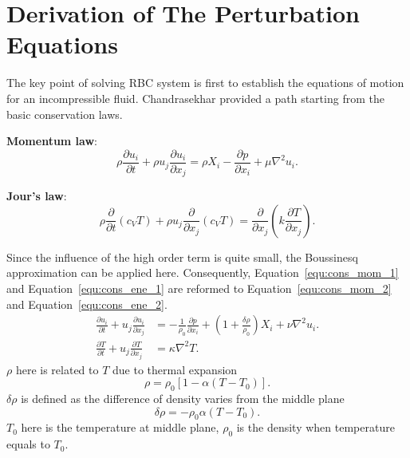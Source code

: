 \section{\label{sec:intr:derv}Derivation of The Perturbation Equations}

The key point of solving RBC system is first to establish the equations of motion for an incompressible fluid. Chandrasekhar provided a path starting from the basic conservation laws.\par
\noindent \textbf{Momentum law}:
\begin{equation}
\rho\frac{\partial u_i}{\partial t}+\rho u_j\frac{\partial u_i}{\partial x_j}=\rho X_i-\frac{\partial p}{\partial x_i}+\mu \nabla^2 u_i.
\label{equ:cons_mom_1}
\end{equation}\par
\noindent \textbf{Jour's law}:
\begin{equation}
\rho\frac{\partial}{\partial t}\left( c_V T \right)+\rho u_j\frac{\partial}{\partial x_j}\left( c_V T \right)=\frac{\partial}{\partial x_j}\left( k\frac{\partial T}{\partial x_j} \right).
\label{equ:cons_ene_1}
\end{equation}\par
\noindent Since the influence of the high order term is quite small, the Boussinesq approximation can be applied here. Consequently, Equation~\ref{equ:cons_mom_1} and Equation~\ref{equ:cons_ene_1} are reformed to Equation~\ref{equ:cons_mom_2} and Equation~\ref{equ:cons_ene_2}. 
\begin{align}
\frac{\partial u_i}{\partial t}+u_j\frac{\partial u_i}{\partial x_j}&=-\frac{1}{\rho_0}\frac{\partial p}{\partial x_i}+\left( 1+\frac{\delta\rho}{\rho_0} \right)X_i+\nu\nabla^2 u_i. \label{equ:cons_mom_2} \\
\frac{\partial T}{\partial t}+u_j\frac{\partial T}{\partial x_j}&=\kappa\nabla^2 T. \label{equ:cons_ene_2}
\end{align}
\(\rho\) here is related to \(T\) due to thermal expansion
\begin{equation}
\rho=\rho_0\left[ 1-\alpha\left( T-T_0 \right) \right].
\end{equation}
\(\delta\rho\) is defined as the difference of density varies from the middle plane
\begin{equation}
\delta\rho=-\rho_0\alpha\left( T-T_0 \right).
\end{equation}
\(T_0\) here is the temperature at middle plane, \(\rho_0\) is the density when temperature equals to \(T_0\).\par
